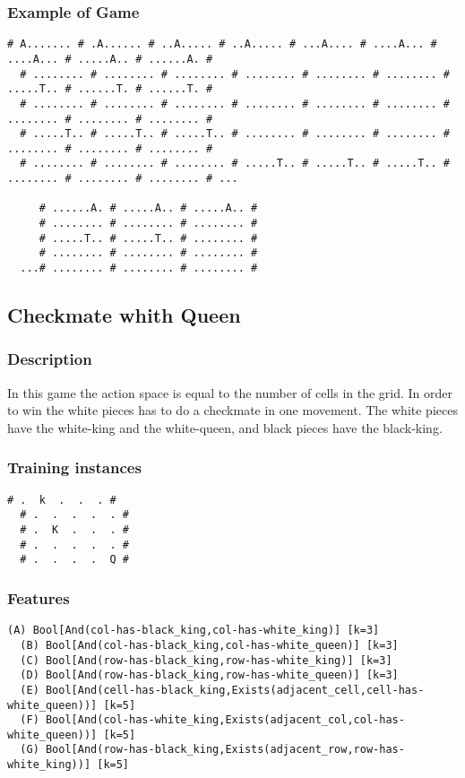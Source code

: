\documentclass[a4paper]{article}
\begin{document}
\subsubsection{Example of Game}
\begin{Verbatim}[fontsize=\footnotesize]
  # A....... # .A...... # ..A..... # ..A..... # ...A.... # ....A... # ....A... # .....A.. # ......A. #
  # ........ # ........ # ........ # ........ # ........ # ........ # .....T.. # ......T. # ......T. #
  # ........ # ........ # ........ # ........ # ........ # ........ # ........ # ........ # ........ #
  # .....T.. # .....T.. # .....T.. # ........ # ........ # ........ # ........ # ........ # ........ #
  # ........ # ........ # ........ # .....T.. # .....T.. # .....T.. # ........ # ........ # ........ # ...

     # ......A. # .....A.. # .....A.. #
     # ........ # ........ # ........ #
     # .....T.. # .....T.. # ........ #
     # ........ # ........ # ........ #
  ...# ........ # ........ # ........ #

\end{Verbatim}


\subsection{Checkmate whith Queen}
\subsubsection{Description}
In this game the action space is equal to the number of cells in the grid. In order to win the white pieces has to do a checkmate in one movement. The white pieces have the white-king and the white-queen, and black pieces have the black-king.

\subsubsection{Training instances}
\begin{Verbatim}[fontsize=\footnotesize]
  # .  k  .  .  . #
  # .  .  .  .  . #
  # .  K  .  .  . #
  # .  .  .  .  . #
  # .  .  .  .  Q #
\end{Verbatim}


\subsubsection{Features}
\begin{Verbatim}[fontsize=\footnotesize]
  (A) Bool[And(col-has-black_king,col-has-white_king)] [k=3]
  (B) Bool[And(col-has-black_king,col-has-white_queen)] [k=3]
  (C) Bool[And(row-has-black_king,row-has-white_king)] [k=3]
  (D) Bool[And(row-has-black_king,row-has-white_queen)] [k=3]
  (E) Bool[And(cell-has-black_king,Exists(adjacent_cell,cell-has-white_queen))] [k=5]
  (F) Bool[And(col-has-white_king,Exists(adjacent_col,col-has-white_queen))] [k=5]
  (G) Bool[And(row-has-black_king,Exists(adjacent_row,row-has-white_king))] [k=5]
\end{Verbatim}
\end{document}

